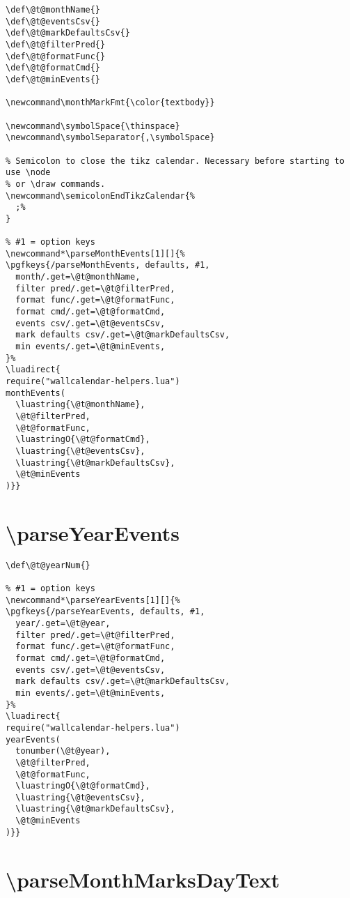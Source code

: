 \documentclass[11pt,oneside]{memoir-article}
\begin{document}
\begin{verbatim}
\def\@t@monthName{}
\def\@t@eventsCsv{}
\def\@t@markDefaultsCsv{}
\def\@t@filterPred{}
\def\@t@formatFunc{}
\def\@t@formatCmd{}
\def\@t@minEvents{}

\newcommand\monthMarkFmt{\color{textbody}}

\newcommand\symbolSpace{\thinspace}
\newcommand\symbolSeparator{,\symbolSpace}

% Semicolon to close the tikz calendar. Necessary before starting to use \node
% or \draw commands.
\newcommand\semicolonEndTikzCalendar{%
  ;%
}

% #1 = option keys
\newcommand*\parseMonthEvents[1][]{%
\pgfkeys{/parseMonthEvents, defaults, #1,
  month/.get=\@t@monthName,
  filter pred/.get=\@t@filterPred,
  format func/.get=\@t@formatFunc,
  format cmd/.get=\@t@formatCmd,
  events csv/.get=\@t@eventsCsv,
  mark defaults csv/.get=\@t@markDefaultsCsv,
  min events/.get=\@t@minEvents,
}%
\luadirect{
require("wallcalendar-helpers.lua")
monthEvents(
  \luastring{\@t@monthName},
  \@t@filterPred,
  \@t@formatFunc,
  \luastringO{\@t@formatCmd},
  \luastring{\@t@eventsCsv},
  \luastring{\@t@markDefaultsCsv},
  \@t@minEvents
)}}
\end{verbatim}

\section{\textbackslash parseYearEvents}
\label{sec:orgbee8a4f}

\begin{verbatim}
\def\@t@yearNum{}

% #1 = option keys
\newcommand*\parseYearEvents[1][]{%
\pgfkeys{/parseYearEvents, defaults, #1,
  year/.get=\@t@year,
  filter pred/.get=\@t@filterPred,
  format func/.get=\@t@formatFunc,
  format cmd/.get=\@t@formatCmd,
  events csv/.get=\@t@eventsCsv,
  mark defaults csv/.get=\@t@markDefaultsCsv,
  min events/.get=\@t@minEvents,
}%
\luadirect{
require("wallcalendar-helpers.lua")
yearEvents(
  tonumber(\@t@year),
  \@t@filterPred,
  \@t@formatFunc,
  \luastringO{\@t@formatCmd},
  \luastring{\@t@eventsCsv},
  \luastring{\@t@markDefaultsCsv},
  \@t@minEvents
)}}
\end{verbatim}

\section{\textbackslash parseMonthMarksDayText}
\label{sec:org5faa64b}
\end{document}
